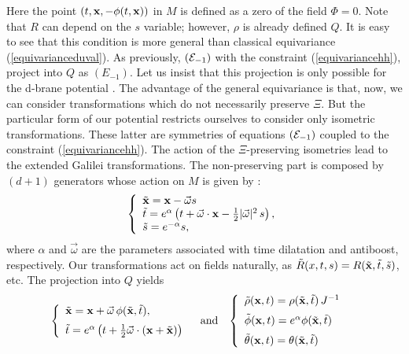 \documentclass[11pt,a4paper]{article}
\begin{document}
Here the point
$\left(t,{\bf x},-\phi(t,{\bf x})\right)$ in $M$ is defined as a zero
of the field $\Phi=0$. Note that $R$
can depend on the $s$ variable; however,
 $\rho$ is already defined  $Q$.
It is easy to see
that this condition is more general than  classical equivariance
(\ref{equivarianceduval}). As previously,
$\displaystyle{({\cal E}_{-1})}$
with the constraint (\ref{equivariancehh}), project into $Q$ as
$\displaystyle{({E}_{-1})}$. Let us  insist that this projection is
only possible for the d-brane potential \cite{HH}. The advantage of the general
equivariance is that, now, we can consider
transformations which do not  necessarily preserve $\Xi$.
But the
particular form of our potential restricts ourselves to
consider only isometric transformations. These latter are symmetries of
equations
$\displaystyle{({\cal E}_{-1})}$ coupled to the constraint
(\ref{equivariancehh}). The action of the $\Xi$-preserving
isometries lead to the extended Galilei transformations. The
non-preserving part is composed by $(d+1)$ generators whose action on $M$
is given by \cite{HH} :
\begin{eqnarray}
\begin{array}{l}
\left\lbrace
\begin{array}{l}
\tilde{{\bf x}}={\bf x}-\vec{\omega}s
\\
\tilde{t}=
e^{\alpha}\left(t+\vec{\omega}\cdot{\bf x}-\frac{1}{2}
\vert\vec{\omega}\vert^2\,s\right),
\\
\tilde{s}=e^{-\alpha}s,
\end{array}
\right.
\end{array}
\label{timedilatationM}
\end{eqnarray}
where $\alpha$ and $\vec{\omega}$ are the parameters associated with
time dilatation and antiboost, respectively.
Our transformations act on
fields naturally, as
$\tilde{R}(x,t,s)=R(\tilde{\bf x},\tilde{t},\tilde{s})$, etc.
The projection into $Q$ yields  \cite{JAC, BJ}
\begin{eqnarray}
\begin{array}{lllll}
\left\lbrace
\begin{array}{l}
\tilde{\bf x}={\bf x}+\vec{\omega}\,\phi(\tilde{\bf x},\tilde{t}),

\\[2mm]
\tilde{t}=e^{\alpha}
\left(t+\frac{1}{2}\vec{\omega}\cdot({\bf x}+
\tilde{\bf x})\right)
\end{array}
\right.
&
\hbox{and}
&
\left\lbrace
\begin{array}{l}
\tilde{\rho}({\bf x},t)=\rho(\tilde{\bf x},\tilde{t})\,J^{-1}
\\[2mm]
\tilde{\phi}({\bf x},t)=e^\alpha\phi(\tilde{\bf x},\tilde{t})
\\[2mm]
\tilde{\theta}({\bf x},t)=\theta(\tilde{\bf x},\tilde{t})
\end{array}
\right.
&
\hbox{}
\end{array}
\label{lise}
\end{eqnarray}
\end{document}
